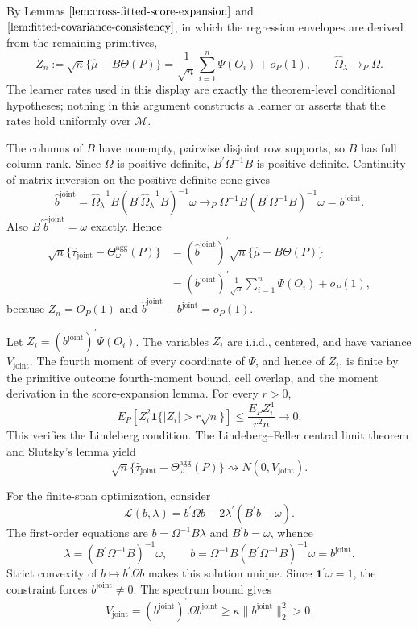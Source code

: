 By Lemmas \(\ref{lem:cross-fitted-score-expansion}\) and \(\ref{lem:fitted-covariance-consistency}\), in which the regression envelopes are derived from the remaining primitives,
\[
 Z_n:=\sqrt n\{\widehat\mu-B\Theta(P)\}
 =\frac1{\sqrt n}\sum_{i=1}^n\Psi(O_i)+o_P(1),
 \qquad
 \widehat\Omega_\lambda\to_P\Omega.
\]
The learner rates used in this display are exactly the theorem-level conditional hypotheses; nothing in this argument constructs a learner or asserts that the rates hold uniformly over \(\mathcal M\).

The columns of \(B\) have nonempty, pairwise disjoint row supports, so \(B\) has full column rank. Since \(\Omega\) is positive definite, \(B^{\prime}\Omega^{-1}B\) is positive definite. Continuity of matrix inversion on the positive-definite cone gives
\[
 \widehat b^{\mathrm{joint}}
 =\widehat\Omega_\lambda^{-1}B
 (B^{\prime}\widehat\Omega_\lambda^{-1}B)^{-1}\omega
 \to_P
 \Omega^{-1}B(B^{\prime}\Omega^{-1}B)^{-1}\omega
 =b^{\mathrm{joint}}.
\]
Also \(B^{\prime}\widehat b^{\mathrm{joint}}=\omega\) exactly. Hence
\[
\begin{aligned}
 \sqrt n\{\widehat\tau_{\mathrm{joint}}-\Theta_\omega^{\mathrm{agg}}(P)\}
 &=(\widehat b^{\mathrm{joint}})^{\prime}
   \sqrt n\{\widehat\mu-B\Theta(P)\}\\
 &=(b^{\mathrm{joint}})^{\prime}
   \frac1{\sqrt n}\sum_{i=1}^n\Psi(O_i)+o_P(1),
\end{aligned}
\]
because \(Z_n=O_P(1)\) and \(\widehat b^{\mathrm{joint}}-b^{\mathrm{joint}}=o_P(1)\).

Let \(Z_i=(b^{\mathrm{joint}})^{\prime}\Psi(O_i)\). The variables \(Z_i\) are i.i.d., centered, and have variance \(V_{\mathrm{joint}}\). The fourth moment of every coordinate of \(\Psi\), and hence of \(Z_i\), is finite by the primitive outcome fourth-moment bound, cell overlap, and the moment derivation in the score-expansion lemma. For every \(r>0\),
\[
 E_P[Z_i^2\mathbf 1\{|Z_i|>r\sqrt n\}]
 \le\frac{E_PZ_i^4}{r^2n}\longrightarrow0.
\]
This verifies the Lindeberg condition. The Lindeberg--Feller central limit theorem and Slutsky's lemma yield
\[
 \sqrt n\{\widehat\tau_{\mathrm{joint}}-\Theta_\omega^{\mathrm{agg}}(P)\}
 \rightsquigarrow N(0,V_{\mathrm{joint}}).
\]

For the finite-span optimization, consider
\[
 \mathcal L(b,\lambda)=b^{\prime}\Omega b-2\lambda^{\prime}(B^{\prime}b-\omega).
\]
The first-order equations are \(b=\Omega^{-1}B\lambda\) and \(B^{\prime}b=\omega\), whence
\[
 \lambda=(B^{\prime}\Omega^{-1}B)^{-1}\omega,
 \qquad
 b=\Omega^{-1}B(B^{\prime}\Omega^{-1}B)^{-1}\omega=b^{\mathrm{joint}}.
\]
Strict convexity of \(b\mapsto b^{\prime}\Omega b\) makes this solution unique. Since \(\mathbf 1^{\prime}\omega=1\), the constraint forces \(b^{\mathrm{joint}}\ne0\). The spectrum bound gives
\[
 V_{\mathrm{joint}}
 =(b^{\mathrm{joint}})^{\prime}\Omega b^{\mathrm{joint}}
 \ge\kappa\|b^{\mathrm{joint}}\|_2^2>0.
\]


